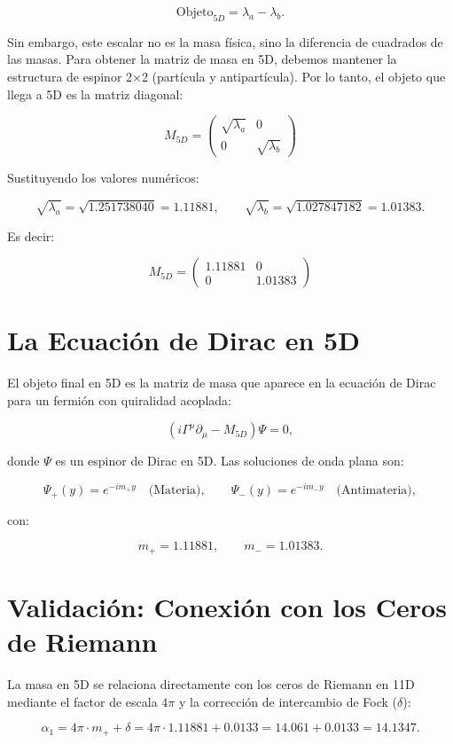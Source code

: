 \documentclass[12pt,a4paper]{article}
\begin{document}
\[
\text{Objeto}_{5D} = \lambda_a - \lambda_b.
\]

Sin embargo, este escalar no es la masa física, sino la diferencia de cuadrados de las masas. Para obtener la matriz de masa en 5D, debemos mantener la estructura de espinor 2×2 (partícula y antipartícula). Por lo tanto, el objeto que llega a 5D es la matriz diagonal:

\[
\boxed{M_{5D} = 
\begin{pmatrix}
\sqrt{\lambda_a} & 0 \\
0 & \sqrt{\lambda_b}
\end{pmatrix}}
\]

Sustituyendo los valores numéricos:

\[
\sqrt{\lambda_a} = \sqrt{1.251738040} = 1.11881, \qquad
\sqrt{\lambda_b} = \sqrt{1.027847182} = 1.01383.
\]

Es decir:

\[
\boxed{M_{5D} = 
\begin{pmatrix}
1.11881 & 0 \\
0 & 1.01383
\end{pmatrix}}
\]

\section{La Ecuación de Dirac en 5D}

El objeto final en 5D es la matriz de masa que aparece en la ecuación de Dirac para un fermión con quiralidad acoplada:

\[
\left( i \Gamma^\mu \partial_\mu - M_{5D} \right) \Psi = 0,
\]

donde \(\Psi\) es un espinor de Dirac en 5D. Las soluciones de onda plana son:

\[
\Psi_{+}(y) = e^{-i m_+ y} \quad \text{(Materia)}, \qquad
\Psi_{-}(y) = e^{-i m_- y} \quad \text{(Antimateria)},
\]

con:

\[
m_+ = 1.11881, \qquad m_- = 1.01383.
\]

\section{Validación: Conexión con los Ceros de Riemann}

La masa en 5D se relaciona directamente con los ceros de Riemann en 11D mediante el factor de escala \(4\pi\) y la corrección de intercambio de Fock (\(\delta\)):

\[
\alpha_1 = 4\pi \cdot m_+ + \delta = 4\pi \cdot 1.11881 + 0.0133 = 14.061 + 0.0133 = 14.1347.
\]
\end{document}
